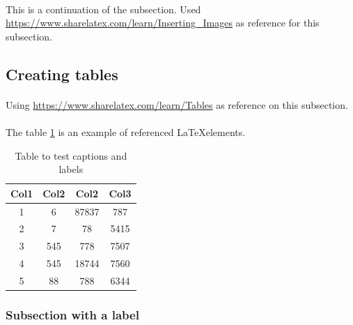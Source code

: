 \documentclass[a4paper,12pt]{article}
\begin{document}
        \paragraph*{} This is a continuation of the subsection. Used \url{https://www.sharelatex.com/learn/Inserting_Images} as reference for this subsection.

    \subsection{Creating tables}
        \paragraph*{} Using \url{https://www.sharelatex.com/learn/Tables} as reference on this subsection.

        \paragraph*{} The table \ref{table:1} is an example of referenced \LaTeX elements.
         
        \begin{table}[h!]
            \centering
            \label{table:1}
            \begin{tabular}{||c c c c||} 
                \hline
                Col1 & Col2 & Col2 & Col3 \\ [0.5ex] 
                \hline\hline
                1 & 6 & 87837 & 787 \\ 
                2 & 7 & 78 & 5415 \\
                3 & 545 & 778 & 7507 \\
                4 & 545 & 18744 & 7560 \\
                5 & 88 & 788 & 6344 \\ [1ex] 
                \hline
            \end{tabular}
            \caption{Table to test captions and labels}
        \end{table}

    \subsubsection{Subsection with a label}
    \label{ssub:sdsd}
        \paragraph*{} \lipsum[5]
\end{document}
